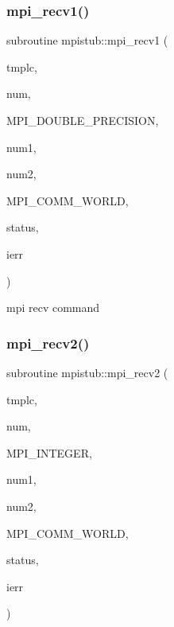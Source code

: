\subsubsection{\texorpdfstring{mpi\_recv1()}{mpi\_recv1()}}
{\footnotesize\ttfamily subroutine mpistub\+::mpi\+\_\+recv1 (\begin{DoxyParamCaption}\item[{double precision}]{tmplc,  }\item[{}]{num,  }\item[{}]{M\+P\+I\+\_\+\+D\+O\+U\+B\+L\+E\+\_\+\+P\+R\+E\+C\+I\+S\+I\+ON,  }\item[{}]{num1,  }\item[{}]{num2,  }\item[{}]{M\+P\+I\+\_\+\+C\+O\+M\+M\+\_\+\+W\+O\+R\+LD,  }\item[{integer, dimension(\+:)}]{status,  }\item[{}]{ierr }\end{DoxyParamCaption})}



mpi recv command 

\mbox{\label{namespacempistub_a9936e4610ebb0c4c17e99d8a6d39e562}} 
\subsubsection{\texorpdfstring{mpi\_recv2()}{mpi\_recv2()}}
{\footnotesize\ttfamily subroutine mpistub\+::mpi\+\_\+recv2 (\begin{DoxyParamCaption}\item[{integer}]{tmplc,  }\item[{}]{num,  }\item[{}]{M\+P\+I\+\_\+\+I\+N\+T\+E\+G\+ER,  }\item[{}]{num1,  }\item[{}]{num2,  }\item[{}]{M\+P\+I\+\_\+\+C\+O\+M\+M\+\_\+\+W\+O\+R\+LD,  }\item[{integer, dimension(\+:)}]{status,  }\item[{}]{ierr }\end{DoxyParamCaption})}

\mbox{\label{namespacempistub_a86129a6bb6e924778df9e0c578f838d2}} 

